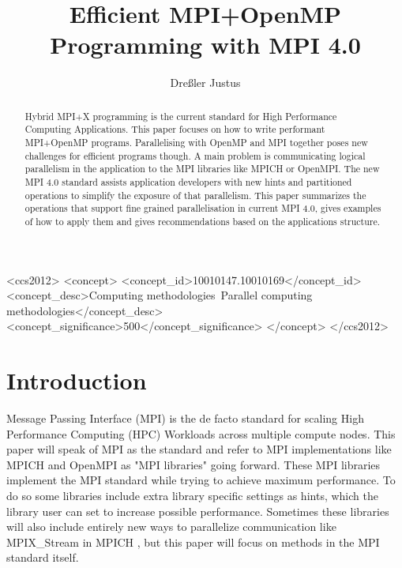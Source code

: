 \documentclass[sigconf]{acmart}
\begin{document}
\title{Efficient MPI+OpenMP Programming with MPI 4.0}
\author{Dreßler Justus}


\begin{CCSXML}
    <ccs2012>
    <concept>
    <concept_id>10010147.10010169</concept_id>
    <concept_desc>Computing methodologies~Parallel computing methodologies</concept_desc>
    <concept_significance>500</concept_significance>
    </concept>
    </ccs2012>
\end{CCSXML}


\begin{abstract}

    Hybrid MPI+X programming is the current standard for High Performance Computing Applications.
    This paper focuses on how to write performant MPI+OpenMP programs.
    Parallelising with OpenMP and MPI together poses new challenges for efficient programs though.
    A main problem is communicating logical parallelism in the application to the MPI libraries like MPICH or OpenMPI.
    The new MPI 4.0 standard assists application developers with new hints and partitioned operations to simplify the exposure of that parallelism.
    This paper summarizes the operations that support fine grained parallelisation in current MPI 4.0, gives examples of how to apply them and gives recommendations based on the applications structure.


\end{abstract}

\maketitle

\section{Introduction}

Message Passing Interface (MPI) is the de facto standard for scaling High Performance Computing (HPC) Workloads across multiple compute nodes.
This paper will speak of MPI as the standard and refer to MPI implementations like MPICH and OpenMPI as "MPI libraries" going forward.
These MPI libraries implement the MPI standard while trying to achieve maximum performance.
To do so some libraries include extra library specific settings as hints, which the library user can set to increase possible performance.
Sometimes these libraries will also include entirely new ways to parallelize communication like MPIX\_Stream in MPICH \cite{Zhou2022}, but this paper will focus on methods in the MPI standard itself.
\end{document}
